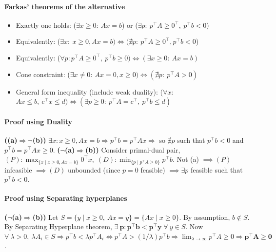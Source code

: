 \documentclass{article}
\begin{document}
\paragraph{Farkas' theorems of the alternative}
\begin{itemize}
    \item Exactly one holds: ($\exists x\ge0:\ Ax=b$) or ($\exists p:\ p^\top A \ge 0^\top,\ p^\top b < 0$)
    \item Equivalently: ($\exists x:\ x\geq 0, Ax = b) \iff (\nexists p:\ p^\top A \geq 0^\top , p^\top b < 0$)
    \item Equivalently: ($\forall p: p^\top A \ge 0^\top,\ p^\top b \ge 0) \iff (\exists x\ge0:\ Ax = b)$
    \item Cone constraint: ($\exists x \neq 0:\ Ax=0, x\geq 0) \iff (\nexists p:\ p^\top A > 0)$
    \item General form inequality (include weak duality): ($\forall x$: $Ax\le b,\ c^\top x \le d) \iff (\exists p\ge0:\ p^\top A = c^\top,\ p^\top b \le d)$ 
\end{itemize} 


\paragraph{Proof using Duality} 
\textbf{((a)$\Rightarrow \neg$(b))} $\exists x: x\geq 0, Ax = b \Rightarrow p^\top b = p^\top Ax \Rightarrow$ so $\nexists p$ such that $p^\top b < 0$ and $p^\top b = p^\top Ax \geq 0$. \textbf{($\neg$(a)$\Rightarrow$(b))} Consider primal-dual pair, $(P):\max_{\{x\mid x\geq 0, Ax=b\}}0^\top x,\; (D): \min_{\{p\mid p^\top A\geq 0\}}p^\top b$. Not (a) $\implies (P)$ infeasible $\implies (D)$ unbounded (since $p = 0$ feasible) $\implies \exists p$ feasible such that $p^\top b < 0$. 

\paragraph{Proof using Separating hyperplanes}
\textbf{($\neg$(a)$\Rightarrow$(b))} Let $S = \{y \mid x\geq 0,\ Ax=y\} = \{Ax \mid x \geq 0\}$. By assumption, $b \notin S$. 
By Separating Hyperplane theorem, $\mathbf{\exists\ p: p^\top b < p^\top y} \; \forall\ y\in S$. 
Now $\forall\ \lambda > 0,\ \lambda A_i \in S \Longrightarrow p^\top b < \lambda p^\top A_i \iff p^\top A > (1/\lambda) p^\top b \Rightarrow \lim_{\lambda \to \infty} p^\top A \geq 0 \Longrightarrow \mathbf{p^\top A \geq 0}$. 
\end{document}
